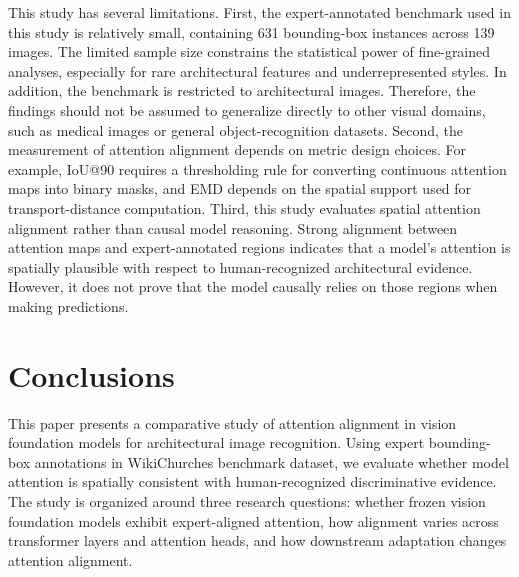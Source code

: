 \documentclass[lineno,pdflatex,sn-mathphys-num]{sn-jnl}%
\theoremstyle{thmstyleone}%
\theoremstyle{thmstyletwo}%
\theoremstyle{thmstylethree}%
\begin{document}
This study has several limitations. First, the expert-annotated benchmark \cite{Barz21WikiChurches} used in this study is relatively small, containing 631 bounding-box instances across 139 images. The limited sample size constrains the statistical power of fine-grained analyses, especially for rare architectural features and underrepresented styles. In addition, the benchmark is restricted to architectural images. Therefore, the findings should not be assumed to generalize directly to other visual domains, such as medical images or general object-recognition datasets. Second, the measurement of attention alignment depends on metric design choices. For example, IoU@90 requires a thresholding rule for converting continuous attention maps into binary masks, and EMD depends on the spatial support used for transport-distance computation. Third, this study evaluates spatial attention alignment rather than causal model reasoning. Strong alignment between attention maps and expert-annotated regions indicates that a model's attention is spatially plausible with respect to human-recognized architectural evidence. However, it does not prove that the model causally relies on those regions when making predictions. 

\section{Conclusions} \label{section conclusions}

This paper presents a comparative study of attention alignment in vision foundation models for architectural image recognition. Using expert bounding-box annotations in WikiChurches benchmark dataset, we evaluate whether model attention is spatially consistent with human-recognized discriminative evidence. The study is organized around three research questions: whether frozen vision foundation models exhibit expert-aligned attention, how alignment varies across transformer layers and attention heads, and how downstream adaptation changes attention alignment.

\end{document}
